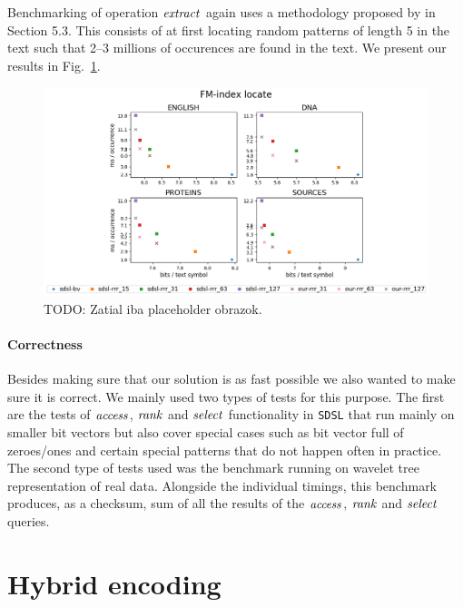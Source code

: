 Benchmarking of operation $\mathit{extract}$ again uses a methodology proposed by \cite{ferragina2009compressed} 
in Section 5.3. This consists of at first locating random patterns of length 5 in the text such
that 2--3 millions of occurences are found in the text. We present our results in Fig.~\ref{obr:benchmark_sdsl_locate}.

\begin{figure}
	\centerline{
		\includegraphics[width=\textwidth, height=0.35\textheight]{images/vysledky_sdsl_locate}
	}
	\caption[TODO]{TODO: Zatial iba placeholder obrazok.
	}
	\label{obr:benchmark_sdsl_locate}
\end{figure}

\paragraph{Correctness}

Besides making sure that our solution is as fast possible we also wanted to make sure it is
correct. We mainly used two types of tests for this purpose. The first are the tests of $\mathit{access}$,
$\mathit{rank}$ and $\mathit{select}$ functionality in \texttt{SDSL} that run mainly on smaller bit vectors
but also cover special cases such as bit vector full of zeroes/ones and certain special
patterns that do not happen often in practice. The second type of tests used was the benchmark
running on wavelet tree representation of real data. Alongside the individual timings, this
benchmark produces, as a checksum, sum of all the results of the $\mathit{access}$, $\mathit{rank}$ and $\mathit{select}$
queries.

\section{Hybrid encoding}


